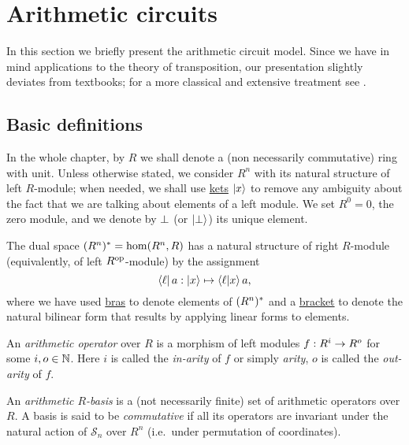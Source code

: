 

\section{Arithmetic circuits}
\label{sec:circuits}

In this section we briefly present the
arithmetic circuit model. Since we have in mind applications to the
theory of transposition, our presentation slightly deviates from
textbooks; for a more classical and extensive treatment see
\cite{burgisser+clausen-shokrollahi,vollmer}.

\subsection{Basic definitions}
In the whole chapter, by $R$ we shall denote a (non necessarily
commutative) ring with unit. Unless otherwise stated, we consider
$R^n$ with its natural structure of left $R$-module; when needed, we
shall use \hyperref[sec:linear-algebra:bra-ket]{kets} $\left\lvert x \right\rangle$ to
remove any ambiguity about the fact that we are talking about elements
of a left module.  We set $R^0=0$, the zero module, and we denote by
$\perp$ (or $\left\lvert \perp \right\rangle$) its unique element.

The dual space $(R^n)^\ast=\hom(R^n,R)$ has a natural structure of
right $R$-module (equivalently, of left $R^{\mathrm{op}}$-module) by the
assignment
\begin{equation}
  \label{eq:232}
  \left\langle \ell \right\rvert a : \left\lvert x \right\rangle \mapsto \left\langle \ell \middle| x \right\rangle a
  \text{,}
\end{equation}
where we have used \hyperref[sec:linear-algebra:bra-ket]{bras} to
denote elements of $(R^n)^\ast$ and a
\hyperref[sec:linear-algebra:bra-ket]{bracket} to denote the natural
bilinear form that results by applying linear forms to elements.

\begin{definition}
  An \emph{arithmetic operator} over $R$ is
  a morphism of left modules $f:R^i\rightarrow R^o$ for some $i,o\in\mathbb{N}$. Here
  $i$ is called the \emph{in-arity} of $f$ or simply
  \emph{arity}, $o$ is called the \emph{out-arity} of $f$.
\end{definition}

\begin{definition}
  An \emph{arithmetic $R$-basis} is a (not
  necessarily finite) set of arithmetic operators over $R$.  A basis
  is said to be \emph{commutative}
  if all its operators are invariant under the natural action of
  $\mathcal{S}_n$ over $R^n$ (i.e.\ under permutation of coordinates).
\end{definition}

